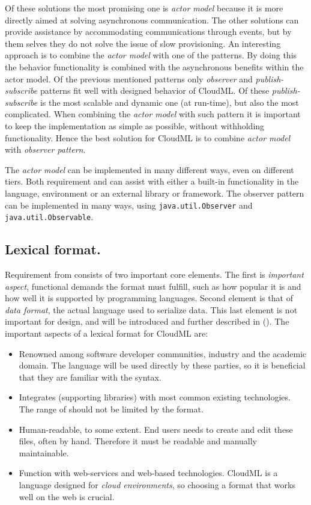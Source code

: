 Of these solutions the most promising one is \emph{actor model} because it is more directly aimed
at solving asynchronous communication.
The other solutions can provide assistance by accommodating communications through events, 
but by them selves they do not solve the issue of slow provisioning.
An interesting approach is to combine the \emph{actor model} with one of the patterns.
By doing this the behavior functionality is combined with the asynchronous benefits within the actor model.
Of the previous mentioned patterns only \emph{observer} and \emph{publish-subscribe} patterns 
fit well with designed behavior of CloudML.
Of these \emph{publish-subscribe} is the most scalable and dynamic one (at run-time),
but also the most complicated.
When combining the \emph{actor model} with such pattern it is important to keep the implementation
as simple as possible, without withholding functionality.
Hence the best solution for CloudML is to combine \emph{actor model} with \emph{observer pattern}.

The \emph{actor model} can be implemented in many different ways, even on different tiers.
Both requirement  and  can assist with either
a built-in functionality in the language, environment or an external library or framework.
The observer pattern can be implemented in many ways,
\eg using \texttt{java.util.Observer} and \texttt{java.util.Observable}.

\subsection{Lexical format.}

Requirement  from  consists of two
important core elements.
The first is \emph{important aspect}, \ie functional demands the format must fulfill,
such as how popular it is and how well it is supported by programming languages.
Second element is that of \emph{data format}, \ie the actual language used to 
serialize data.
This last element is not important for design, and will be introduced and
further described in  ().
The important aspects of a lexical format for CloudML are:
\begin{itemize}
  \item Renowned among software developer communities, industry and the academic domain.
    The language will be used directly by these parties, so it is beneficial
    that they are familiar with the syntax.
  \item Integrates (supporting libraries) with most common existing technologies.
    The range of  should not be limited by the format.
  \item Human-readable, to some extent.
    End users needs to create and edit these files, often by hand.
    Therefore it must be readable and manually maintainable.
  \item Function with web-services and web-based technologies.
    CloudML is a language designed for \emph{cloud environments},
    so choosing a format that works well on the web is crucial.
\end{itemize}

